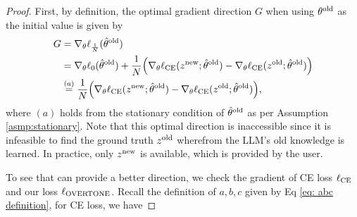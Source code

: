 \begin{proof}

First, by definition, 
the optimal gradient direction $G$ when using $\theta^{\text{old}}$ as the initial value
is given by 
\begin{align*}
G 
&= 
\nabla_\theta \ell_{\frac{1}{N}}(\hat{\theta}^{\text{old}}) \\
&= 
\nabla_\theta \ell_0(\hat{\theta}^{\text{old}}) + \frac{1}{N}\qty(\nabla_\theta \ell_{\text{CE}} (z^{\text{new}}; \hat{\theta}^{\text{old}}) - \nabla_\theta \ell_{\text{CE}} (z^{\text{old}}; \hat{\theta}^{\text{old}}))\\
&\overset{(a)}{=} 
\frac{1}{N}\qty(\nabla_\theta \ell_{\text{CE}} (z^{\text{new}}; \hat{\theta}^{\text{old}}) - \nabla_\theta \ell_{\text{CE}} (z^{\text{old}}; \hat{\theta}^{\text{old}})),
\end{align*}
where $(a)$ holds from the stationary condition of $\hat{\theta}^{\text{old}}$ as per Assumption \ref{asmp:stationary}. 
Note that this optimal direction is inaccessible since it is infeasible to find the ground truth $z^{\text{old}}$ wherefrom the LLM's old knowledge is learned. 
In practice, only $z^{\text{new}}$ is available, which is provided by the user. 

To see that {\NAME} can provide a better direction, 
we check the gradient of CE loss $\ell_{\text{CE}}$ and our loss $\ell_{\text{OVERTONE}}$. 
Recall the definition of $a, b, c$ given by Eq \eqref{eq: abc definition}, for CE loss, we have 






\end{proof}
